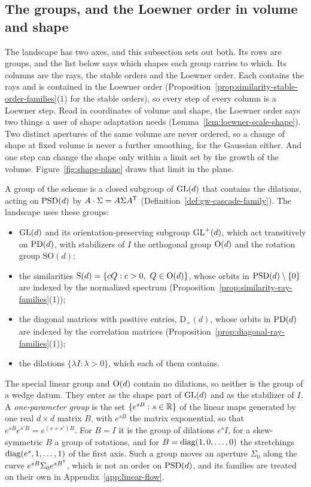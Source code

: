 \subsection{The groups, and the Loewner order in volume and shape}\label{sec:scale-shape}

The landscape has two axes, and this subsection sets out both. Its rows are groups, and the list below
says which shapes each group carries to which. Its columns are the rays, the stable orders and the
Loewner order. Each contains the rays and is contained in the Loewner order
(Proposition~\ref{prop:similarity-stable-order-families}(1) for the stable orders), so every step of
every column is a Loewner step. Read in coordinates of volume and shape, the Loewner order says two
things a user of shape adaptation needs (Lemma~\ref{lem:loewner-scale-shape}). Two distinct apertures
of the same volume are never ordered, so a change of shape at fixed volume is never a further
smoothing, for the Gaussian either. And one step can change the shape only within a limit set by the
growth of the volume. Figure~\ref{fig:shape-plane} draws that limit in the plane.

A group of the scheme is a closed subgroup of $\mathrm{GL}(d)$ that contains the dilations, acting on
$\mathrm{PSD}(d)$ by $A \cdot \Sigma = A\Sigma A^{\mathsf{T}}$ (Definition~\ref{def:gw-cascade-family}). The
landscape uses these groups:
\begin{itemize}
\item $\mathrm{GL}(d)$ and its orientation-preserving subgroup $\mathrm{GL}^+(d)$, which act transitively on
$\mathrm{PD}(d)$, with stabilizers of $I$ the orthogonal group $\mathrm{O}(d)$ and the rotation group
$\mathrm{SO}(d)$;
\item the similarities $\mathrm S(d) = \{cQ : c > 0,\ Q \in \mathrm{O}(d)\}$, whose orbits in
$\mathrm{PSD}(d) \setminus \{0\}$ are indexed by the normalized spectrum
(Proposition~\ref{prop:similarity-ray-families}(1));
\item the diagonal matrices with positive entries, $\mathrm D_+(d)$, whose orbits in $\mathrm{PD}(d)$ are
indexed by the correlation matrices (Proposition~\ref{prop:diagonal-ray-families}(1));
\item the dilations $\{\lambda I : \lambda > 0\}$, which each of them contains.
\end{itemize}
The special linear group and $\mathrm{O}(d)$ contain no dilations, so neither is the group of a wedge
datum. They enter as the shape part of $\mathrm{GL}(d)$ and as the stabilizer of $I$. A
\emph{one-parameter group} is the set $\{e^{sB} : s \in \mathbb{R}\}$ of the linear maps generated by one real
$d \times d$ matrix $B$, with $e^{sB}$ the matrix exponential, so that $e^{sB}e^{s'B} = e^{(s+s')B}$.
For $B = I$ it is the group of dilations $e^s I$, for a skew-symmetric $B$ a group of rotations, and
for $B = \operatorname{diag}(1, 0, \dots, 0)$ the stretchings $\operatorname{diag}(e^s, 1, \dots, 1)$ of the first axis. Such a
group moves an aperture $\Sigma_0$ along the curve $e^{sB}\Sigma_0e^{sB^{\mathsf{T}}}$, which is not an order
on $\mathrm{PSD}(d)$, and its families are treated on their own in Appendix~\ref{app:linear-flow}.

